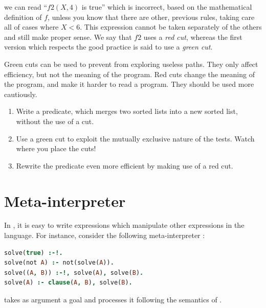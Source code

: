 \documentclass{../../../tp}
\begin{document}
we can read ``$f2(X,4)$ is true'' which is incorrect, based on the mathematical definition of $f$, unless you know that there are other, previous rules, taking care all of cases where $X < 6$. This expression cannot be taken separately of the others and still make proper sense. We say that $f2$ uses a \emph{red cut}, whereas the first version which respects the good practice is said to use a \emph{green cut}.

Green cuts can be used to prevent \prolog from exploring useless paths. They only affect efficiency, but not the meaning of the program. Red cuts change the meaning of the program, and make it harder to read a program. They should be used more cautiously.

\begin{instruction}
	
	\begin{enumerate}
		\item Write a   predicate, which merges two sorted lists into a new sorted list, without the use of a cut.
		\item Use a green cut to exploit the mutually exclusive nature of the tests. Watch where you place the cuts!
		\item Rewrite the predicate even more efficient by making use of a red cut.
		
	\end{enumerate}
	
	
	
\end{instruction}

\section{Meta-interpreter}

In \prolog, it is easy to write expressions which manipulate other expressions in the language. For instance, consider the following meta-interpreter :

\begin{lstlisting}[language=prolog]
solve(true) :-!.
solve(not A) :- not(solve(A)).
solve((A, B)) :-!, solve(A), solve(B).
solve(A) :- clause(A, B), solve(B).
\end{lstlisting}

 takes as argument a goal and processes it following the semantics of \prolog. 
\end{document}
